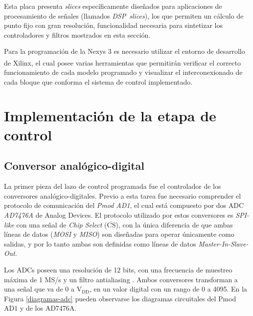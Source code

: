 Esta placa presenta \emph{slices} específicamente diseñados para aplicaciones de procesamiento de señales (llamados \mbox{\emph{DSP slices}}), los que permiten un cálculo de punto fijo con gran resolución, funcionalidad necesaria para sintetizar los controladores y filtros mostrados en esta sección.

Para la programación de la Nexys 3 es necesario utilizar el entorno de desarrollo de Xilinx\textsuperscript\textregistered \hspace{0.6pt}, el cual posee varias herramientas que permitirán verificar el correcto funcionamiento de cada modelo programado y visualizar el interconexionado de cada bloque que conforma el sistema de control implementado. 

\section{Implementación de la etapa de control}

\subsection{Conversor analógico-digital}

La primer pieza del lazo de control programada fue el controlador de los conversores analógico-digitales. Previo a esta tarea fue necesario comprender el protocolo de comunicación del \emph{Pmod AD1}, el cual está compuesto por dos ADC \emph{AD7476A} de Analog Devices. El protocolo utilizado por estos conversores es \emph{SPI-like} con una señal de \emph{Chip Select} ($\overline{\mbox{CS}}$), con la única diferencia de que ambas líneas de datos (\emph{MOSI} y \emph{MISO}) son diseñadas para operar únicamente como salidas, y por lo tanto ambas son definidas como líneas de datos \emph{Master-In-Slave-Out}.

Los ADCs poseen una resolución de 12 bits, con una frecuencia de muestreo máxima de 1 MS/s y un filtro antialiasing \cite{ad7476a}. Ambos conversores transforman a una señal que va de 0 a $\mathrm{V_{DD}}$, en un valor digital con un rango de 0 a 4095. En la Figura \ref{diagramas-adc} pueden observarse los diagramas circuitales del Pmod AD1 y de los AD7476A.

